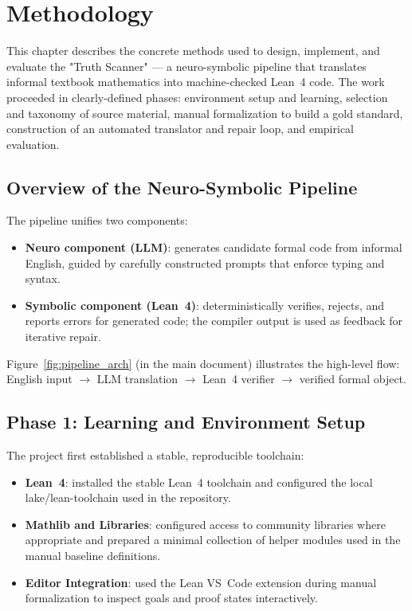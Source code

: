 \chapter{Methodology}
\label{chap:Three}

This chapter describes the concrete methods used to design, implement, and evaluate the "Truth Scanner" — a neuro-symbolic pipeline that translates informal textbook mathematics into machine-checked Lean~4 code. The work proceeded in clearly-defined phases: environment setup and learning, selection and taxonomy of source material, manual formalization to build a gold standard, construction of an automated translator and repair loop, and empirical evaluation.

\section{Overview of the Neuro-Symbolic Pipeline}
\label{sec:pipeline-overview}

The pipeline unifies two components:

\begin{itemize}
    \item \textbf{Neuro component (LLM)}: generates candidate formal code from informal English, guided by carefully constructed prompts that enforce typing and syntax.
    \item \textbf{Symbolic component (Lean~4)}: deterministically verifies, rejects, and reports errors for generated code; the compiler output is used as feedback for iterative repair.
\end{itemize}

Figure~\ref{fig:pipeline_arch} (in the main document) illustrates the high-level flow: English input $\to$ LLM translation $\to$ Lean~4 verifier $\to$ verified formal object.

\section{Phase 1: Learning and Environment Setup}
\label{sec:phase1-learning}

The project first established a stable, reproducible toolchain:

\begin{itemize}
    \item \textbf{Lean~4}: installed the stable Lean~4 toolchain and configured the local lake/lean-toolchain used in the repository.
    \item \textbf{Mathlib and Libraries}: configured access to community libraries where appropriate and prepared a minimal collection of helper modules used in the manual baseline definitions.
    \item \textbf{Editor Integration}: used the Lean VS~Code extension during manual formalization to inspect goals and proof states interactively.
\end{itemize}

